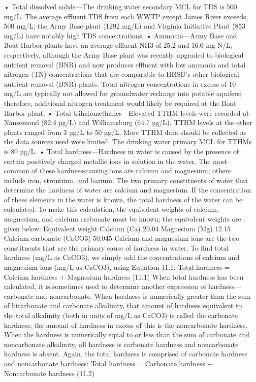 \documentclass{article}
\begin{document}
• Total dissolved solids---The drinking water secondary MCL for TDS is
500 mg/L. The average effluent TDS from each WWTP except James River
exceeds 500 mg/L; the Army Base plant (1292 mg/L) and Virginia
Initiative Plant (853 mg/L) have notably high TDS concentrations. •
Ammonia---Army Base and Boat Harbor plants have an average effluent NH3
of 25.2 and 16.0 mg-N/L, respectively, although the Army Base plant was
recently upgraded to biological nutrient removal (BNR) and now produces
effluent with low ammonia and total nitrogen (TN) concentrations that
are comparable to HRSD's other biological nutrient removal (BNR) plants.
Total nitrogen concentrations in excess of 10 mg/L are typically not
allowed for groundwater recharge into potable aquifers; therefore,
additional nitrogen treatment would likely be required at the Boat
Harbor plant. • Total trihalomethanes---Elevated TTHM levels were
recorded at Nansemond (82.4 µg/L) and Williamsburg (64.7 µg/L). TTHM
levels at the other plants ranged from 3 µg/L to 50 µg/L. More TTHM data
should be collected as the data sources used were limited. The drinking
water primary MCL for TTHMs is 80 µg/L. • Total hardness---Hardness in
water is caused by the presence of certain positively charged metallic
ions in solution in the water. The most common of these hardness-causing
ions are calcium and magnesium; others include iron, strontium, and
barium. The two primary constituents of water that determine the
hardness of water are calcium and magnesium. If the concentration of
these elements in the water is known, the total hardness of the water
can be calculated. To make this calculation, the equivalent weights of
calcium, magnesium, and calcium carbonate must be known; the equivalent
weights are given below: Equivalent weight Calcium (Ca) 20.04 Magnesium
(Mg) 12.15 Calcium carbonate (CaCO3) 50.045 Calcium and magnesium ions
are the two constituents that are the primary cause of hardness in
water. To find total hardness (mg/L as CaCO3), we simply add the
concentrations of calcium and magnesium ions (mg/L as CaCO3), using
Equation 11.1: Total hardness = Calcium hardness + Magnesium hardness
(11.1) When total hardness has been calculated, it is sometimes used to
determine another expression of hardness---carbonate and noncarbonate.
When hardness is numerically greater than the sum of bicarbonate and
carbonate alkalinity, that amount of hardness equivalent to the total
alkalinity (both in units of mg/L as CaCO3) is called the carbonate
hardness; the amount of hardness in excess of this is the noncarbonate
hardness. When the hardness is numerically equal to or less than the sum
of carbonate and noncarbonate alkalinity, all hardness is carbonate
hardness and noncarbonate hardness is absent. Again, the total hardness
is comprised of carbonate hardness and noncarbonate hardness: Total
hardness = Carbonate hardness + Noncarbonate hardness (11.2)
\end{document}
